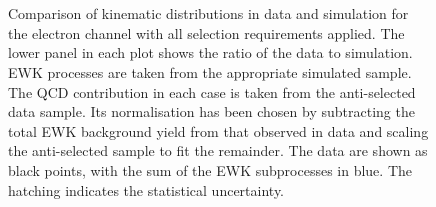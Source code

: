 \begin{figure}[h!]
\centering
{}
\\
\\
\caption[Comparison of kinematic distributions in data and simulation for the
electron channel]{Comparison of kinematic distributions in data and simulation
  for the electron channel with all selection requirements applied. The lower
  panel in each plot shows the ratio of the data to simulation. \ac{EWK}
  processes are taken from the appropriate simulated sample. The \ac{QCD}
  contribution in each case is taken from the anti-selected data sample. Its
  normalisation has been chosen by subtracting the total \ac{EWK} background
  yield from that observed in data and scaling the anti-selected sample to fit
  the remainder. The data are shown as black points, with the sum of the
  \ac{EWK} subprocesses in blue. The hatching indicates the statistical
  uncertainty.}
\label{fig:wpol_datamc_ele}
\end{figure}

